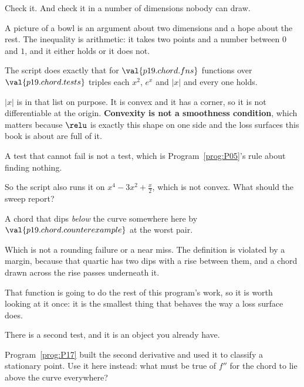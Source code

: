 \begin{fr}
\begin{ansblock}
Check it. And check it in a number of dimensions nobody can draw.
\end{ansblock}

A picture of a bowl is an argument about two dimensions and a hope about the
rest. The inequality is arithmetic: it takes two points and a number between
$0$ and $1$, and it either holds or it does not.

The script does exactly that for $\val{p19.chord.fns}$ functions over
$\val{p19.chord.tests}$ triples each \dash{} $x^{2}$, $e^{x}$ and
$\lvert x \rvert$ \dash{} and every one holds.

\begin{note}
$\lvert x \rvert$ is in that list on purpose. It is convex and it has a corner,
so it is not differentiable at the origin. \textbf{Convexity is not a
smoothness condition}, which matters because $\relu$ is exactly this shape on
one side and the loss surfaces this book is about are full of it.
\end{note}
\end{fr}

\begin{fr}
A test that cannot fail is not a test, which is Program~\ref{prog:P05}'s rule
about finding nothing.

So the script also runs it on $x^{4} - 3x^{2} + \frac{x}{2}$, which is not
convex. What should the sweep report?
\dotline
\nextframe
\end{fr}

\begin{fr}
\begin{ansblock}
A chord that dips \emph{below} the curve somewhere \dash{} here by
$\val{p19.chord.counterexample}$ at the worst pair.
\end{ansblock}

Which is not a rounding failure or a near miss. The definition is violated by
a margin, because that quartic has two dips with a rise between them, and a
chord drawn across the rise passes underneath it.

That function is going to do the rest of this program's work, so it is worth
looking at it once: it is the smallest thing that behaves the way a loss
surface does.
\end{fr}

\begin{fr}
There is a second test, and it is an object you already have.

Program~\ref{prog:P17} built the second derivative and used it to classify a
stationary point. Use it here instead: what must be true of $f''$ for the
chord to lie above the curve everywhere?
\dotline
\nextframe
\end{fr}

